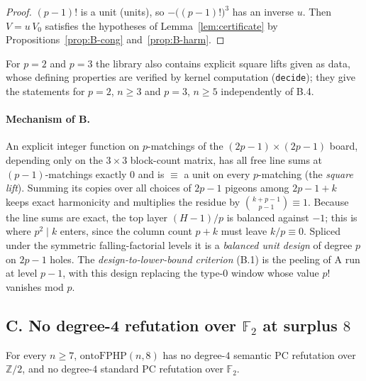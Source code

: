 \begin{proof}
$(p-1)!$ is a unit (units), so $-\bigl((p-1)!\bigr)^3$ has an inverse
$u$.  Then $V=u\,V_0$ satisfies the hypotheses of
Lemma~\ref{lem:certificate} by Propositions~\ref{prop:B-cong} and~\ref{prop:B-harm}.
\end{proof}

\begin{remark}
For $p=2$ and $p=3$ the library also contains explicit square lifts given as data,
whose defining properties are verified by kernel computation (\texttt{decide});
they give the statements for $p=2$, $n\ge3$ and $p=3$, $n\ge5$ independently of
B.4.
\end{remark}

\paragraph{Mechanism of B.}
An explicit integer function on $p$-matchings of the $(2p-1)\times(2p-1)$ board,
depending only on the $3\times3$ block-count matrix, has all free line sums at
$(p-1)$-matchings exactly $0$ and is $\equiv$ a unit on every $p$-matching (the
\emph{square lift}).  Summing its copies over all choices of $2p-1$ pigeons among
$2p-1+k$ keeps exact harmonicity and multiplies the residue by
$\binom{k+p-1}{p-1}\equiv1$.  Because the line sums are exact, the top layer
$(H-1)/p$ is balanced against $-1$; this is where $p^2\mid k$ enters, since the
column count $p+k$ must leave $k/p\equiv0$.  Spliced under the symmetric
falling-factorial levels it is a \emph{balanced unit design} of degree $p$ on
$2p-1$ holes.  The \emph{design-to-lower-bound criterion} (B.1) is the peeling of A
run at level $p-1$, with this design replacing the type-$0$ window whose value $p!$
vanishes mod $p$.

\subsection{C. No degree-4 refutation over $\mathbb F_2$ at surplus $8$}
\label{sec:lean-C}

\begin{theorem}[C]\label{thm:C}
For every $n\ge7$, $\mathrm{ontoFPHP}(n,8)$ has no degree-$4$ semantic PC refutation
over $\mathbb Z/2$, and no degree-$4$ standard PC refutation over
$\mathbb F_2$.
\end{theorem}

